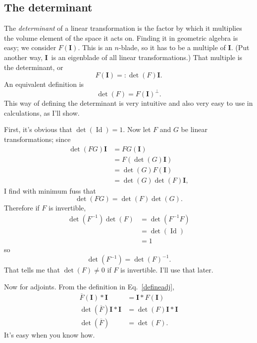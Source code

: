 \documentclass{utarticle}
\newcommand{\bl}[1]{\ensuremath{\bm{#1}}}
\newcommand{\I}{\bl{I}}
\newcommand{\Id}{\operatorname{Id}}
\newcommand{\scprod}[2]{\ensuremath{#1 * #2}}
\newcommand{\dual}[1]{\ensuremath{#1^\perp}}
\newcommand{\adj}[1]{\ensuremath{\overline{#1}}}
\begin{document}
\subsection{The determinant}
\label{determinant}

The \emph{determinant} of a linear transformation is the factor by which it multiplies the volume
element of the space it acts on.  Finding it in geometric algebra is easy; we consider $F(\I)$.  This 
is an $n$-blade, so it has to be a multiple of \I.  (Put another way, \I\ is an eigenblade of all linear 
transformations.)  That multiple is the determinant, or
\begin{equation} F(\I) =: \det(F) \I. \end{equation}
An equivalent definition is
\begin{equation} \det(F) = \dual{F(\I)}. \end{equation}
This way of defining the determinant is very intuitive and also very easy to use in calculations, as I'll show.

First, it's obvious that $\det(\Id) = 1$.  Now let $F$ and $G$ be linear transformations; since
\begin{align}
\det(FG)\I & = FG(\I) \nonumber \\
                  & = F\left( \det(G) \I \right) \nonumber \\
                  & = \det(G) F(\I) \nonumber \\
                  & = \det(G) \det(F) \I, 
\end{align}
I find with minimum fuss that
\begin{equation} \det(FG) = \det(F) \det(G). \end{equation}
Therefore if $F$ is invertible,
\begin{align} 
\det(F^{-1}) \det(F) & = \det(F^{-1}F) \nonumber \\
                                  & = \det(\Id) \nonumber \\
                                  & = 1 
\end{align}
so
\begin{equation} \det(F^{-1}) = \det(F)^{-1}. \end{equation}
That tells me that $\det(F) \neq 0$ if $F$ is invertible.  I'll use that later.

Now for adjoints.  From the definition in Eq.~\eqref{defineadj},
\begin{align}
\scprod{\adj{F}(\I)}{\I} & = \scprod{\I}{F(\I)} \nonumber \\
\det(\adj{F}) \scprod{\I}{\I} & = \det(F) \scprod{\I}{\I} \nonumber \\
\det(\adj{F}) & = \det(F).
\end{align}
It's easy when you know how.
\end{document}
